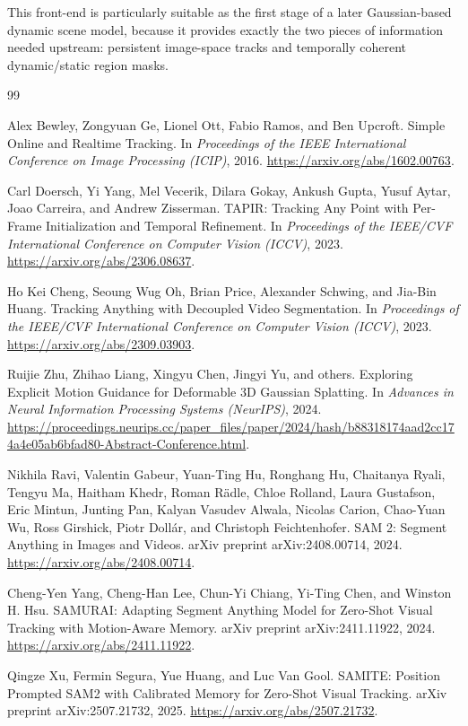 \documentclass[11pt]{article}
\begin{document}
This front-end is particularly suitable as the first stage of a later Gaussian-based dynamic scene model, because it provides exactly the two pieces of information needed upstream: persistent image-space tracks and temporally coherent dynamic/static region masks.

\begin{thebibliography}{99}

Alex Bewley, Zongyuan Ge, Lionel Ott, Fabio Ramos, and Ben Upcroft.
\newblock Simple Online and Realtime Tracking.
\newblock In \emph{Proceedings of the IEEE International Conference on Image Processing (ICIP)}, 2016.
\newblock \url{https://arxiv.org/abs/1602.00763}.

Carl Doersch, Yi Yang, Mel Vecerik, Dilara Gokay, Ankush Gupta, Yusuf Aytar, Joao Carreira, and Andrew Zisserman.
\newblock TAPIR: Tracking Any Point with Per-Frame Initialization and Temporal Refinement.
\newblock In \emph{Proceedings of the IEEE/CVF International Conference on Computer Vision (ICCV)}, 2023.
\newblock \url{https://arxiv.org/abs/2306.08637}.

Ho Kei Cheng, Seoung Wug Oh, Brian Price, Alexander Schwing, and Jia-Bin Huang.
\newblock Tracking Anything with Decoupled Video Segmentation.
\newblock In \emph{Proceedings of the IEEE/CVF International Conference on Computer Vision (ICCV)}, 2023.
\newblock \url{https://arxiv.org/abs/2309.03903}.

Ruijie Zhu, Zhihao Liang, Xingyu Chen, Jingyi Yu, and others.
\newblock Exploring Explicit Motion Guidance for Deformable 3D Gaussian Splatting.
\newblock In \emph{Advances in Neural Information Processing Systems (NeurIPS)}, 2024.
\newblock \url{https://proceedings.neurips.cc/paper_files/paper/2024/hash/b88318174aad2cc174a4e05ab6bfad80-Abstract-Conference.html}.

Nikhila Ravi, Valentin Gabeur, Yuan-Ting Hu, Ronghang Hu, Chaitanya Ryali, Tengyu Ma, Haitham Khedr, Roman R\"adle, Chloe Rolland, Laura Gustafson, Eric Mintun, Junting Pan, Kalyan Vasudev Alwala, Nicolas Carion, Chao-Yuan Wu, Ross Girshick, Piotr Doll\'ar, and Christoph Feichtenhofer.
\newblock SAM 2: Segment Anything in Images and Videos.
\newblock arXiv preprint arXiv:2408.00714, 2024.
\newblock \url{https://arxiv.org/abs/2408.00714}.

Cheng-Yen Yang, Cheng-Han Lee, Chun-Yi Chiang, Yi-Ting Chen, and Winston H. Hsu.
\newblock SAMURAI: Adapting Segment Anything Model for Zero-Shot Visual Tracking with Motion-Aware Memory.
\newblock arXiv preprint arXiv:2411.11922, 2024.
\newblock \url{https://arxiv.org/abs/2411.11922}.

Qingze Xu, Fermin Segura, Yue Huang, and Luc Van Gool.
\newblock SAMITE: Position Prompted SAM2 with Calibrated Memory for Zero-Shot Visual Tracking.
\newblock arXiv preprint arXiv:2507.21732, 2025.
\newblock \url{https://arxiv.org/abs/2507.21732}.

\end{thebibliography}
\end{document}
